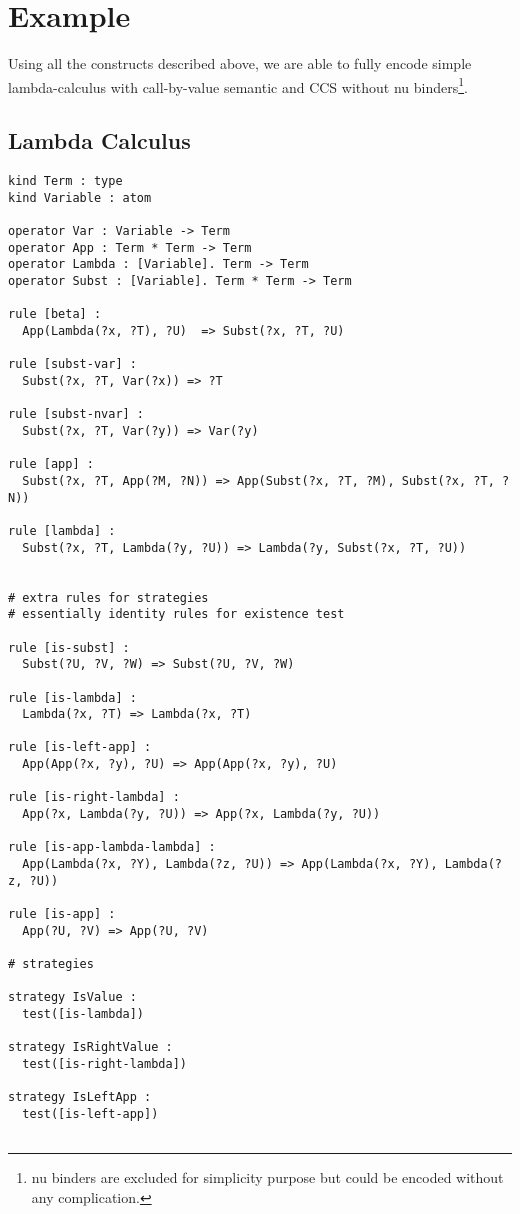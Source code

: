 \documentclass[12pt,a4paper]{article}
\begin{document}
\section{Example}
Using all the constructs described above, we are able to fully encode simple 
lambda-calculus with call-by-value semantic and CCS without nu binders\footnote{nu 
binders are excluded for simplicity purpose but could be encoded without any 
complication.}.

\subsection*{Lambda Calculus}
{\fontsize{8}{8}
\begin{verbatim}
kind Term : type
kind Variable : atom

operator Var : Variable -> Term
operator App : Term * Term -> Term
operator Lambda : [Variable]. Term -> Term
operator Subst : [Variable]. Term * Term -> Term

rule [beta] :
  App(Lambda(?x, ?T), ?U)  => Subst(?x, ?T, ?U)

rule [subst-var] :
  Subst(?x, ?T, Var(?x)) => ?T

rule [subst-nvar] :
  Subst(?x, ?T, Var(?y)) => Var(?y)

rule [app] :
  Subst(?x, ?T, App(?M, ?N)) => App(Subst(?x, ?T, ?M), Subst(?x, ?T, ?N))

rule [lambda] :
  Subst(?x, ?T, Lambda(?y, ?U)) => Lambda(?y, Subst(?x, ?T, ?U))


# extra rules for strategies
# essentially identity rules for existence test

rule [is-subst] :
  Subst(?U, ?V, ?W) => Subst(?U, ?V, ?W)

rule [is-lambda] :
  Lambda(?x, ?T) => Lambda(?x, ?T)

rule [is-left-app] : 
  App(App(?x, ?y), ?U) => App(App(?x, ?y), ?U)

rule [is-right-lambda] :
  App(?x, Lambda(?y, ?U)) => App(?x, Lambda(?y, ?U))

rule [is-app-lambda-lambda] :
  App(Lambda(?x, ?Y), Lambda(?z, ?U)) => App(Lambda(?x, ?Y), Lambda(?z, ?U))

rule [is-app] :
  App(?U, ?V) => App(?U, ?V)

# strategies

strategy IsValue :
  test([is-lambda])

strategy IsRightValue :
  test([is-right-lambda])

strategy IsLeftApp :
  test([is-left-app])


\end{verbatim}}
\end{document}
